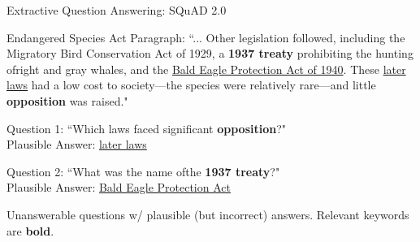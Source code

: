 \documentclass[12pt,aspectratio=169,handout]{beamer}
\begin{document}
%
%
%
%
%
%

\begin{frame}{Extractive Question Answering: SQuAD 2.0}
	
\begin{scriptsize}
\begin{example}
Endangered Species Act Paragraph: ``... Other legislation followed, including the Migratory Bird Conservation Act of 1929, a \textbf{1937 treaty} prohibiting the hunting ofright and gray whales, and the \underline{Bald Eagle Protection Act of 1940}. These \underline{later laws} had a low cost to society---the species were relatively rare---and little \textbf{opposition} was raised."

Question 1: ``Which laws faced significant \textbf{opposition}?" \\
Plausible Answer: \underline{later laws}

Question 2: ``What was the name ofthe \textbf{1937 treaty}?" \\
Plausible Answer: \underline{Bald Eagle Protection Act}
\end{example}
\end{scriptsize}

Unanswerable questions w/ plausible (but incorrect) answers. Relevant keywords are \textbf{bold}.

	
	
\end{frame}
\end{document}
